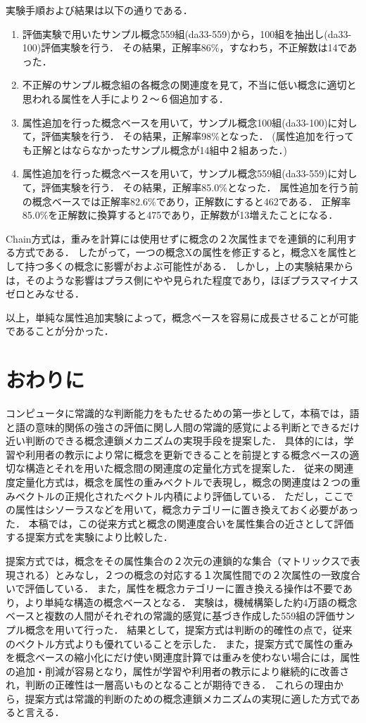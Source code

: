 実験手順および結果は以下の通りである．
\begin{enumerate}
	\item 評価実験で用いたサンプル概念559組(da33-559)から，100組を抽出し(da33-100)評価実験を行う．
	その結果，正解率86\%，すなわち，不正解数は14であった．
	\item 不正解のサンプル概念組の各概念の関連度を見て，不当に低い概念に適切と思われる属性を人手により２〜６個追加する．
	\item 属性追加を行った概念ベースを用いて，サンプル概念100組(da33-100)に対して，評価実験を行う．
	その結果，正解率98\%となった．
	(属性追加を行っても正解とはならなかったサンプル概念が14組中２組あった．)
	\item 属性追加を行った概念ベースを用いて，サンプル概念559組(da33-559)に対して，評価実験を行う．
	その結果，正解率85.0\%となった．
	属性追加を行う前の概念ベースでは正解率82.6\%であり，正解数にすると462である．
	正解率85.0\%を正解数に換算すると475であり，正解数が13増えたことになる．
\end{enumerate}

Chain方式は，重みを計算には使用せずに概念の２次属性までを連鎖的に利用する方式である．
したがって，一つの概念Xの属性を修正すると，概念Xを属性として持つ多くの概念に影響がおよぶ可能性がある．
しかし，上の実験結果からは，そのような影響はプラス側にやや見られた程度であり，ほぼプラスマイナスゼロとみなせる．

以上，単純な属性追加実験によって，概念ベースを容易に成長させることが可能であることが分かった．

\section{おわりに}

コンピュータに常識的な判断能力をもたせるための第一歩として，本稿では，語と語の意味的関係の強さの評価に関し人間の常識的感覚による判断とできるだけ近い判断のできる概念連鎖メカニズムの実現手段を提案した．
具体的には，学習や利用者の教示により常に概念を更新できることを前提とする概念ベースの適切な構造とそれを用いた概念間の関連度の定量化方式を提案した．
従来の関連度定量化方式は，概念を属性の重みベクトルで表現し，概念の関連度は２つの重みベクトルの正規化されたベクトル内積により評価している．
ただし，ここでの属性はシソーラスなどを用いて，概念カテゴリーに置き換えておく必要があった．
本稿では，この従来方式と概念の関連度合いを属性集合の近さとして評価する提案方式を実験により比較した．

提案方式では，概念をその属性集合の２次元の連鎖的な集合（マトリックスで表現される）とみなし，２つの概念の対応する１次属性間での２次属性の一致度合いで評価している．
また，属性を概念カテゴリーに置き換える操作は不要であり，より単純な構造の概念ベースとなる．
実験は，機械構築した約4万語の概念ベースと複数の人間がそれぞれの常識的感覚に基づき作成した559組の評価サンプル概念を用いて行った．
結果として，提案方式は判断の的確性の点で，従来のベクトル方式よりも優れていることを示した．
また，提案方式で属性の重みを概念ベースの縮小化にだけ使い関連度計算では重みを使わない場合には，属性の追加・削減が容易となり，属性が学習や利用者の教示により継続的に改善され，判断の正確性は一層高いものとなることが期待できる．
これらの理由から，提案方式は常識的判断のための概念連鎖メカニズムの実現に適した方式であると言える．

